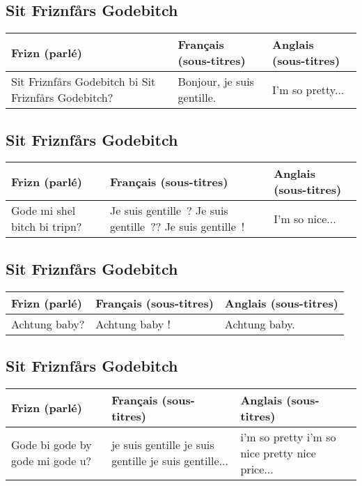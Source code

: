 {%
\parindent 0pt
\noindent
\ifx\preLilyPondExample \undefined
\else
  \expandafter\preLilyPondExample
\fi
\def\lilypondbook{}%

\ifx\postLilyPondExample \undefined
\else
  \expandafter\postLilyPondExample
\fi
}

\subsection*{Sit Friznfårs Godebitch}
\begin{tabular}{|p{2in}|p{2in}|p{2in}|}\hline
Frizn (parlé) & Français (sous-titres) & Anglais (sous-titres) \\\hline
Sit Friznfårs Godebitch bi Sit Friznfårs Godebitch? &
Bonjour, je suis gentille. &
I'm so pretty... \\\hline
\end{tabular}\par
\subsection*{Sit Friznfårs Godebitch}
\begin{tabular}{|p{2in}|p{2in}|p{2in}|}\hline
Frizn (parlé) & Français (sous-titres) & Anglais (sous-titres) \\\hline
Gode mi shel bitch bi tripn? &
Je suis gentille~? Je suis gentille~?? Je suis gentille~! &
I'm so nice... \\\hline
\end{tabular}\par
\subsection*{Sit Friznfårs Godebitch}
\begin{tabular}{|p{2in}|p{2in}|p{2in}|}\hline
Frizn (parlé) & Français (sous-titres) & Anglais (sous-titres) \\\hline
Achtung baby? &
Achtung baby ! &
Achtung baby. \\\hline
\end{tabular}\par
\subsection*{Sit Friznfårs Godebitch}
\begin{tabular}{|p{2in}|p{2in}|p{2in}|}\hline
Frizn (parlé) & Français (sous-titres) & Anglais (sous-titres) \\\hline
Gode bi gode by gode mi gode u? &
je suis gentille je suis gentille je suis gentille... &
i'm so pretty i'm so nice pretty nice price...  \\\hline
\end{tabular}\par
